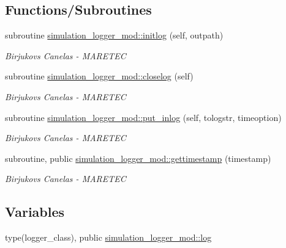\subsection*{Functions/\+Subroutines}
\begin{DoxyCompactItemize}
\item 
subroutine \hyperlink{namespacesimulation__logger__mod_abf603e657da9104a8060ab53c72f0aca}{simulation\+\_\+logger\+\_\+mod\+::initlog} (self, outpath)
\begin{DoxyCompactList}\small\item\em Birjukovs Canelas -\/ M\+A\+R\+E\+T\+EC \end{DoxyCompactList}\item 
subroutine \hyperlink{namespacesimulation__logger__mod_aa6d1aaea74403186da0f98afb74ecebe}{simulation\+\_\+logger\+\_\+mod\+::closelog} (self)
\begin{DoxyCompactList}\small\item\em Birjukovs Canelas -\/ M\+A\+R\+E\+T\+EC \end{DoxyCompactList}\item 
subroutine \hyperlink{namespacesimulation__logger__mod_a34980631cfcf2d2172aa3b491acace4c}{simulation\+\_\+logger\+\_\+mod\+::put\+\_\+inlog} (self, tologstr, timeoption)
\begin{DoxyCompactList}\small\item\em Birjukovs Canelas -\/ M\+A\+R\+E\+T\+EC \end{DoxyCompactList}\item 
subroutine, public \hyperlink{namespacesimulation__logger__mod_a0326a5eeb649b041064a01d96aef0989}{simulation\+\_\+logger\+\_\+mod\+::gettimestamp} (timestamp)
\begin{DoxyCompactList}\small\item\em Birjukovs Canelas -\/ M\+A\+R\+E\+T\+EC \end{DoxyCompactList}\end{DoxyCompactItemize}
\subsection*{Variables}
\begin{DoxyCompactItemize}
\item 
type(logger\+\_\+class), public \hyperlink{namespacesimulation__logger__mod_aa778de9905350741e1f40bb04fdc1cf6}{simulation\+\_\+logger\+\_\+mod\+::log}
\end{DoxyCompactItemize}
